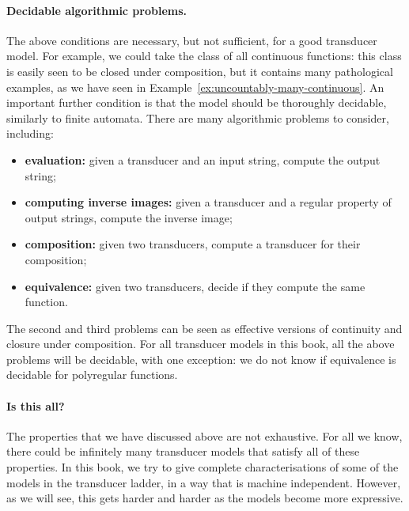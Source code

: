 \paragraph*{Decidable algorithmic problems.} The above conditions are necessary, but not sufficient, for a good transducer model. For example, we could take the class of all continuous functions: this class is easily seen to be closed under composition, but it contains many pathological examples, as we have seen in Example~\ref{ex:uncountably-many-continuous}. An important further condition is that the model should be thoroughly decidable, similarly to finite automata.  There are many algorithmic problems to consider, including:
\begin{itemize}
    \item \textbf{evaluation:} given a transducer and an input string, compute the output string;
    \item \textbf{computing inverse images:} given a transducer and a  regular property of output strings, compute the inverse image;
    \item \textbf{composition:} given two transducers, compute a transducer for their composition;
    \item \textbf{equivalence:} given two transducers, decide if they compute the same function.
\end{itemize}
The second and third problems can be seen as effective versions of  continuity and closure under composition. For all transducer models in this book, all the above problems will be decidable, with one exception: we do not know if equivalence is decidable for polyregular functions.

\paragraph*{Is this all?} The properties that we have discussed above are not exhaustive. For all we know, there could be infinitely many transducer models that satisfy all of these properties. In this book, we try to give complete characterisations of some of the models in the transducer ladder, in a way that is machine independent. However, as we will see, this gets harder and harder as the models become more expressive.  
\exerciseheader



